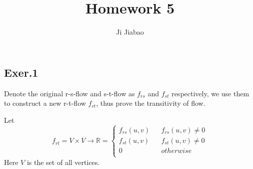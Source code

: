 \documentclass[UTF8]{ctexart}
\begin{document}
 

\title{Homework 5}
\author{Ji Jiabao}
\maketitle

\subsection*{Exer.1}
    Denote the original r-s-flow and s-t-flow as $f_{rs}$ and $f_{st}$ respectively,
    we use them to construct a new r-t-flow $f_{rt}$, thus prove the transitivity of flow.
    
    Let 
    $$ f_{rt} = V \times V \rightarrow \mathbb{R} = \left\{
        \begin{aligned}
        f_{rs}(u, v) & & f_{rs}(u,v) \neq 0 \\
        f_{st}(u, v) & & f_{st}(u, v) \neq 0 \\
        0 & & otherwise\\
        \end{aligned}
        \right.
    $$
    Here $V$ is the set of all vertices.
\end{document}
